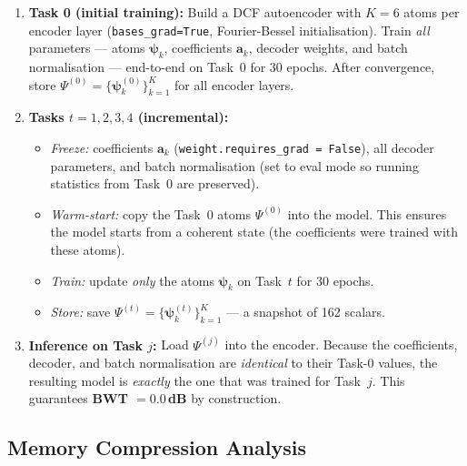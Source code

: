\documentclass[11pt,letterpaper]{article}
\newcommand{\avec}{\mathbf{a}}
\newcommand{\psivec}{\boldsymbol{\psi}}
\begin{document}
\begin{enumerate}[leftmargin=*]
  \item \textbf{Task 0 (initial training):}
    Build a DCF autoencoder with $K = 6$ atoms per encoder layer
    (\texttt{bases\_grad=True}, Fourier-Bessel initialisation).
    Train \emph{all} parameters --- atoms $\psivec_k$, coefficients $\avec_k$,
    decoder weights, and batch normalisation --- end-to-end on Task~0 for
    30 epochs.  After convergence, store
    $\Psi^{(0)} = \{\psivec_k^{(0)}\}_{k=1}^{K}$ for all encoder layers.

  \item \textbf{Tasks $t = 1, 2, 3, 4$ (incremental):}
    \begin{itemize}
      \item \emph{Freeze:} coefficients $\avec_k$
            (\texttt{weight.requires\_grad = False}), all decoder parameters,
            and batch normalisation (set to eval mode so running statistics
            from Task~0 are preserved).
      \item \emph{Warm-start:} copy the Task~0 atoms $\Psi^{(0)}$ into the
            model.  This ensures the model starts from a coherent state
            (the coefficients were trained with these atoms).
      \item \emph{Train:} update \emph{only} the atoms $\psivec_k$
            on Task~$t$ for 30 epochs.
      \item \emph{Store:} save
            $\Psi^{(t)} = \{\psivec_k^{(t)}\}_{k=1}^{K}$ --- a snapshot
            of 162 scalars.
    \end{itemize}

  \item \textbf{Inference on Task $j$:}
    Load $\Psi^{(j)}$ into the encoder.  Because the coefficients, decoder,
    and batch normalisation are \emph{identical} to their Task-0 values, the
    resulting model is \emph{exactly} the one that was trained for Task~$j$.
    This guarantees \textbf{BWT $= 0.0$\,dB} by construction.
\end{enumerate}

\subsection{Memory Compression Analysis}
\end{document}
